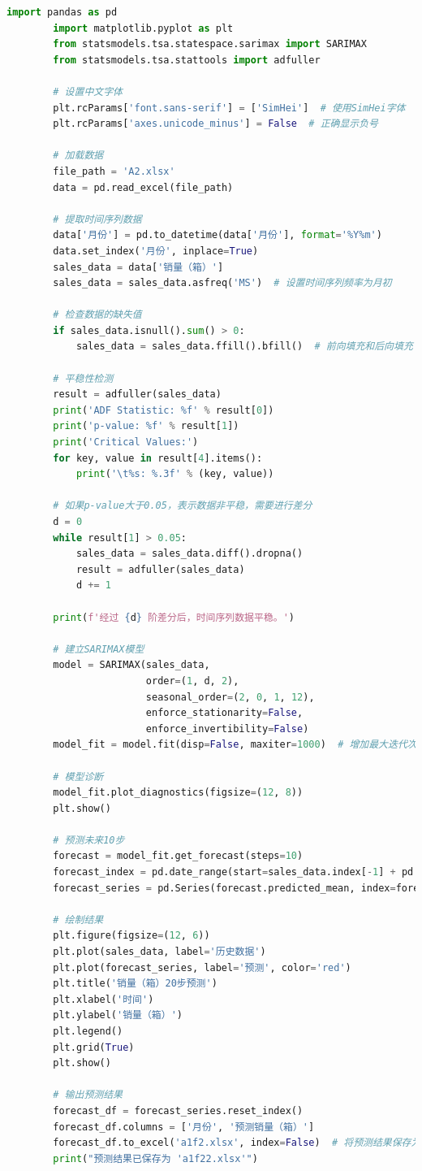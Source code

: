 \documentclass[a4paper]{article}
\begin{document}
	\begin{lstlisting}[language=Python]
		import pandas as pd
		import matplotlib.pyplot as plt
		from statsmodels.tsa.statespace.sarimax import SARIMAX
		from statsmodels.tsa.stattools import adfuller
		
		# 设置中文字体
		plt.rcParams['font.sans-serif'] = ['SimHei']  # 使用SimHei字体
		plt.rcParams['axes.unicode_minus'] = False  # 正确显示负号
		
		# 加载数据
		file_path = 'A2.xlsx'
		data = pd.read_excel(file_path)
		
		# 提取时间序列数据
		data['月份'] = pd.to_datetime(data['月份'], format='%Y%m')
		data.set_index('月份', inplace=True)
		sales_data = data['销量（箱）']
		sales_data = sales_data.asfreq('MS')  # 设置时间序列频率为月初
		
		# 检查数据的缺失值
		if sales_data.isnull().sum() > 0:
			sales_data = sales_data.ffill().bfill()  # 前向填充和后向填充
		
		# 平稳性检测
		result = adfuller(sales_data)
		print('ADF Statistic: %f' % result[0])
		print('p-value: %f' % result[1])
		print('Critical Values:')
		for key, value in result[4].items():
			print('\t%s: %.3f' % (key, value))
		
		# 如果p-value大于0.05，表示数据非平稳，需要进行差分
		d = 0
		while result[1] > 0.05:
			sales_data = sales_data.diff().dropna()
			result = adfuller(sales_data)
			d += 1
		
		print(f'经过 {d} 阶差分后，时间序列数据平稳。')
		
		# 建立SARIMAX模型
		model = SARIMAX(sales_data,
						order=(1, d, 2),
						seasonal_order=(2, 0, 1, 12),
						enforce_stationarity=False,
						enforce_invertibility=False)
		model_fit = model.fit(disp=False, maxiter=1000)  # 增加最大迭代次数
		
		# 模型诊断
		model_fit.plot_diagnostics(figsize=(12, 8))
		plt.show()
		
		# 预测未来10步
		forecast = model_fit.get_forecast(steps=10)
		forecast_index = pd.date_range(start=sales_data.index[-1] + pd.DateOffset(months=1), periods=20, freq='MS')
		forecast_series = pd.Series(forecast.predicted_mean, index=forecast_index)
		
		# 绘制结果
		plt.figure(figsize=(12, 6))
		plt.plot(sales_data, label='历史数据')
		plt.plot(forecast_series, label='预测', color='red')
		plt.title('销量（箱）20步预测')
		plt.xlabel('时间')
		plt.ylabel('销量（箱）')
		plt.legend()
		plt.grid(True)
		plt.show()
		
		# 输出预测结果
		forecast_df = forecast_series.reset_index()
		forecast_df.columns = ['月份', '预测销量（箱）']
		forecast_df.to_excel('a1f2.xlsx', index=False)  # 将预测结果保存为Excel文件
		print("预测结果已保存为 'a1f22.xlsx'")
		
	\end{lstlisting}
\end{document}
